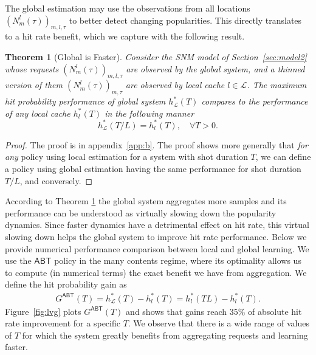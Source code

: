 \documentclass[10pt, conference, letterpaper]{IEEEtran}
\newcommand{\ABT}{\textsf{ABT}}
\newtheorem{theorem}{Theorem}
\def\Lcal{\mathcal{L}}
\begin{document}
The global estimation may use the observations from all locations $(N^l_m(\tau))_{m,l,\tau}$ to better detect changing popularities. This directly translates to a hit rate benefit, which we capture with the following result.

\begin{theorem}[Global is Faster]\label{th:agg}
Consider the SNM model of Section~\ref{sec:model2} whose  requests $(N^l_m(\tau))_{m,l,\tau}$ are observed by the global system, and a thinned version of them $(N^l_m(\tau))_{m,\tau}$ are observed by local cache $l\in\Lcal$. 
The maximum hit probability performance of global system $h_\mathcal L^{*}(T)$ compares to the performance of any local cache $h_l^*(T)$ in the following manner
\[
h_\mathcal L^{*}(T/L)=h_l^*(T),\quad \forall T>0.
\]
\end{theorem}
\begin{proof}
The proof is in appendix~\ref{app:b}. The proof shows more generally that \emph{for any} policy using local estimation for a system with shot duration $T$, we can define a policy using global estimation having the same performance for shot duration $T/L$, and conversely.
\end{proof}
According to Theorem \ref{th:agg} the global system aggregates more samples and its performance can be understood as virtually slowing down the popularity dynamics. 
Since faster dynamics have  a detrimental effect on hit rate, this virtual slowing down helps the global system to improve hit rate performance. 
Below we provide numerical performance comparison between local and global learning. We use the $\ABT$ policy in the many contents regime, where its optimality allows us to compute (in numerical terms) the exact benefit we have from aggregation. We define the hit probability gain as
\begin{align*}
G^{\ABT}(T)=h_\mathcal L^{*}(T)-h_l^{*}(T)=h_l^{*}(TL)-h_l^{*}(T).
\end{align*}
Figure~\ref{fig:lvg} plots $G^{\ABT}(T)$ and shows that gains reach $35\%$ of absolute hit rate improvement for a specific $T$. We observe that there is a wide range of values of $T$ for which the system greatly benefits from aggregating requests and learning faster.
\end{document}
